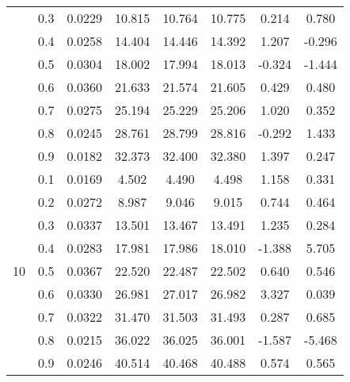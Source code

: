 \documentclass[11pt,a4paper]{report}
\begin{document}
\begin{longtable}{ | c | c || c | c | c | c | c | c | }
 & 0.3 & 0.0229 & 10.815 & 10.764 & 10.775 & 0.214 & 0.780 \\
 & 0.4 & 0.0258 & 14.404 & 14.446 & 14.392 & 1.207 & -0.296 \\
 & 0.5 & 0.0304 & 18.002 & 17.994 & 18.013 & -0.324 & -1.444 \\
 & 0.6 & 0.0360 & 21.633 & 21.574 & 21.605 & 0.429 & 0.480 \\
 & 0.7 & 0.0275 & 25.194 & 25.229 & 25.206 & 1.020 & 0.352 \\
 & 0.8 & 0.0245 & 28.761 & 28.799 & 28.816 & -0.292 & 1.433 \\
 & 0.9 & 0.0182 & 32.373 & 32.400 & 32.380 & 1.397 & 0.247 \\
 \hline
\multirow{9}{*}{10} & 0.1 & 0.0169 & 4.502 & 4.490 & 4.498 & 1.158 & 0.331 \\
 & 0.2 & 0.0272 & 8.987 & 9.046 & 9.015 & 0.744 & 0.464 \\
 & 0.3 & 0.0337 & 13.501 & 13.467 & 13.491 & 1.235 & 0.284 \\
 & 0.4 & 0.0283 & 17.981 & 17.986 & 18.010 & -1.388 & 5.705 \\
 & 0.5 & 0.0367 & 22.520 & 22.487 & 22.502 & 0.640 & 0.546 \\
 & 0.6 & 0.0330 & 26.981 & 27.017 & 26.982 & 3.327 & 0.039 \\
 & 0.7 & 0.0322 & 31.470 & 31.503 & 31.493 & 0.287 & 0.685 \\
 & 0.8 & 0.0215 & 36.022 & 36.025 & 36.001 & -1.587 & -5.468 \\
 & 0.9 & 0.0246 & 40.514 & 40.468 & 40.488 & 0.574 & 0.565 \\
 \hline
\hline
\end{longtable}
\end{document}
